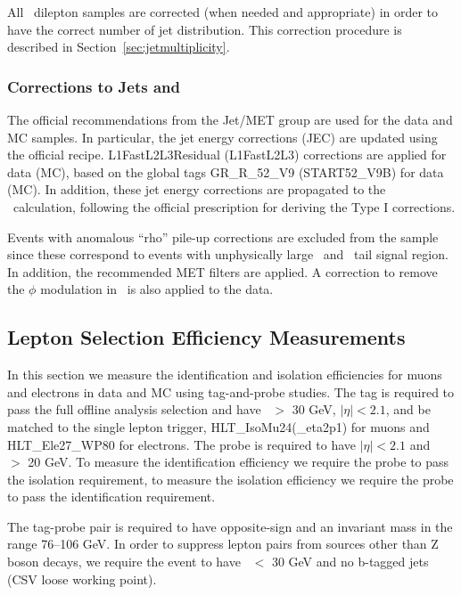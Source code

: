 All \ttbar\ dilepton samples are corrected (when needed and
appropriate) 
in order to have the correct number of jet distribution.  This
correction procedure is described in Section~\ref{sec:jetmultiplicity}.


\subsubsection{Corrections to Jets and \met}
\label{sec:JetMet}

The official recommendations from the Jet/MET group are used for 
the data and MC samples. In particular, the jet
energy corrections (JEC) are updated using the official recipe.
L1FastL2L3Residual (L1FastL2L3) corrections are applied for data (MC),
based on the global tags GR\_R\_52\_V9 (START52\_V9B) for
data (MC). In addition, these jet energy corrections are propagated to
the \met\ calculation, following the official prescription for
deriving the Type I corrections. 

Events with anomalous ``rho'' pile-up corrections are excluded from the sample since these 
correspond to events with unphysically large \met\ and \mt\ tail
signal region. In addition, the recommended MET filters are applied. 
A correction to remove the $\phi$ modulation in \met\ is also applied
to the data.


\subsection{Lepton Selection Efficiency Measurements}
\label{sec:lepEff}

In this section we measure the identification and isolation efficiencies for muons and electrons in data and MC using tag-and-probe studies. 
The tag is required to pass the full offline analysis selection and have \pt\ $>$ 30 GeV, $|\eta|<2.1$, and be matched to the single
lepton trigger, HLT\_IsoMu24(\_eta2p1) for muons and HLT\_Ele27\_WP80 for electrons. 
The probe is required to have $|\eta|<2.1$ and \pt\ $>$ 20 GeV. To measure the identification efficiency we require the probe to pass the isolation requirement,
to measure the isolation efficiency we require the probe to pass the
identification requirement.

The tag-probe pair is required to have opposite-sign and an invariant mass in the range 76--106 GeV.
In order to suppress lepton pairs from sources other than Z boson
decays, we require the event to have \met\ $<$ 30 GeV and no b-tagged
jets (CSV loose working point).

